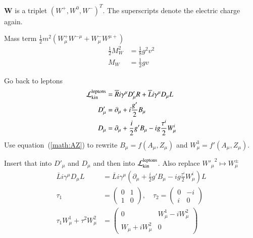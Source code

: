 $\pmb W$ is a triplet $(W^+, W^0,  W^-)^T $. The superscripts denote the electric charge again.

Mass term $\frac{1}{2} m^2 (W_\mu^+ W^{- \mu} + W^-_\mu W^{\mu +})$
\begin{align*}
   \frac{1}{2} M_W^2 &= \frac{1}{8} g^2 v^2 \\
   M_W &= \frac{1}{2} g v
\end{align*}

Go back to leptons
\begin{align*}
   \mathcal{L}_{\text{kin}}^\text{leptons} &= \overline{R} i \gamma^\mu D'_\mu R + \overline{L} i \gamma^\mu D_\mu L \\
   D'_\mu &= \partial_\mu + i \frac{g'}{2} B_\mu \\
   D_\mu &= \partial_\mu + \frac{i}{2} g' B_\mu - ig \frac{\tau^i}{2} W_\mu^i
\end{align*}
Use equation~(\ref{math:AZ}) to rewrite $B_\mu = f(A_\mu, Z_\mu)$ and $W_\mu^3 = f'(A_\mu, Z_\mu)$.

Insert that into $D'_\mu$ and $D_\mu$ and then into $\mathcal{L}_\text{kin}^\text{leptons}$. Also replace ${W'_\mu}^2 \mapsto W_\mu^{\pm}$
\begin{align*}
   \overline{L} i \gamma^\mu D_\mu L &= \overline{L} i \gamma^\mu  \left( \partial_\mu + \frac{i}{2} g' B_\mu - ig \frac{\tau^i}{2} W_\mu^i \right) L \\
   \tau_1 &= \begin{pmatrix} 0 & 1 \\ 1 & 0 \end{pmatrix}, \quad \tau_2 = \begin{pmatrix} 0 & -i \\ i & 0\end{pmatrix} \\
   \tau_1 W^1_\mu + \tau^2 W_\mu^2 &= \begin{pmatrix} 0 & W_\mu^1 - iW_\mu^2 \\ W_\mu + iW_\mu^2 & 0 \end{pmatrix}
\end{align*}

